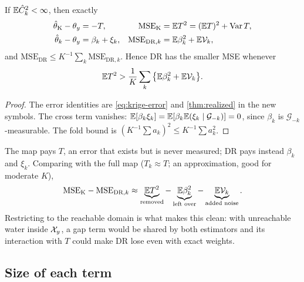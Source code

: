 \begin{proposition}\label{prop:mse}
If $\mathbb{E}\hat C_k^2<\infty$, then exactly
\begin{align*}
  \hat\theta_{\mathrm K}-\theta_y&=-T, & \mathrm{MSE}_{\mathrm K}&=\mathbb{E} T^2=(\mathbb{E} T)^2+\operatorname{Var} T,\\
  \hat\theta_k-\theta_y&=\beta_k+\xi_k, & \mathrm{MSE}_{\mathrm{DR},k}&=\mathbb{E}\beta_k^2+\mathbb{E}\mathcal V_k ,
\end{align*}
and $\mathrm{MSE}_{\mathrm{DR}}\le K^{-1}\sum_k\mathrm{MSE}_{\mathrm{DR},k}$. Hence DR has the smaller MSE
whenever
\begin{equation}\label{eq:mse-sufficient}
  \mathbb{E} T^2>\frac1K\sum_k\big\{\mathbb{E}\beta_k^2+\mathbb{E}\mathcal V_k\big\}.
\end{equation}
\end{proposition}

\begin{proof}
The error identities are \eqref{eq:krige-error} and \cref{thm:realized} in the new symbols. The cross
term vanishes: $\mathbb{E}[\beta_k\xi_k]=\mathbb{E}[\beta_k\mathbb{E}(\xi_k\mid\mathcal G_{-k})]=0$, since $\beta_k$ is
$\mathcal G_{-k}$-measurable. The fold bound is $(K^{-1}\sum a_k)^2\le K^{-1}\sum a_k^2$.
\end{proof}

The map pays $T$, an error that exists but is never measured; DR pays instead $\beta_k$ and $\xi_k$.
Comparing with the full map ($T_k\approx T$; an approximation, good for moderate $K$),
\begin{equation}\label{eq:mse-diff}
  \mathrm{MSE}_{\mathrm K}-\mathrm{MSE}_{\mathrm{DR},k}\approx
  \underbrace{\mathbb{E} T^2}_{\text{removed}}-\underbrace{\mathbb{E}\beta_k^2}_{\text{left over}}
  -\underbrace{\mathbb{E}\mathcal V_k}_{\text{added noise}} .
\end{equation}
Restricting to the reachable domain is what makes this clean: with unreachable water inside $\mathcal{X}_y$,
a gap term would be shared by both estimators and its interaction with $T$ could make DR lose even with
exact weights.

\subsection{Size of each term}

